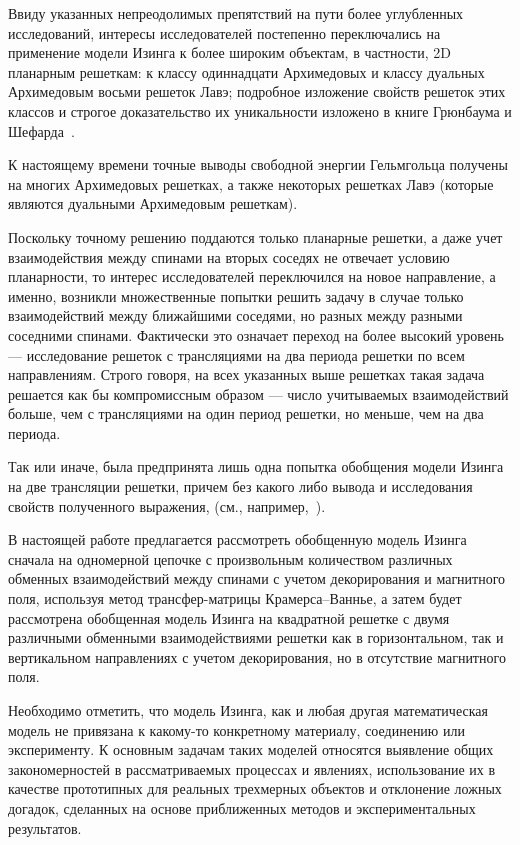 Ввиду указанных непреодолимых препятствий на пути более углубленных исследований, интересы исследователей постепенно переключались на применение модели Изинга к более широким объектам, в частности, 2D планарным решеткам: к классу одиннадцати Архимедовых и классу дуальных Архимедовым восьми решеток Лавэ; подробное изложение свойств решеток этих классов и строгое доказательство их уникальности изложено в книге Грюнбаума и Шефарда~\cite{grunbaum1987}. 

К настоящему времени точные выводы свободной энергии Гельмгольца получены на многих Архимедовых  решетках, а также некоторых решетках Лавэ (которые являются дуальными Архимедовым решеткам).

Поскольку точному решению поддаются только планарные решетки, а даже учет взаимодействия между спинами на вторых соседях не отвечает условию планарности, то интерес исследователей переключился на новое направление, а именно, возникли множественные попытки решить задачу в случае только взаимодействий между ближайшими соседями, но разных между разными соседними спинами. Фактически это означает переход на более высокий уровень — исследование решеток с трансляциями на два периода решетки по всем направлениям. Строго говоря, на всех указанных выше решетках такая задача решается как бы компромиссным образом — число учитываемых взаимодействий больше, чем с трансляциями на один период решетки, но меньше, чем на два периода. 

Так или иначе, была предпринята лишь одна попытка обобщения модели Изинга на две трансляции решетки, причем без какого либо вывода и исследования свойств полученного выражения, (см., например,~\cite{utiyama1951, syozi1972}).

В настоящей работе предлагается рассмотреть обобщенную модель Изинга сначала на одномерной цепочке с произвольным количеством различных обменных взаимодействий между спинами с учетом декорирования и магнитного поля, используя метод трансфер-матрицы Крамерса--Ваннье, а затем будет рассмотрена обобщенная модель Изинга на квадратной решетке с двумя различными обменными взаимодействиями решетки как в горизонтальном, так и вертикальном направлениях с учетом декорирования, но в отсутствие магнитного поля.

Необходимо отметить, что модель Изинга, как и любая другая математическая модель не привязана к какому-то конкретному материалу, соединению или эксперименту. К основным задачам таких моделей относятся выявление общих закономерностей в рассматриваемых процессах и явлениях, использование их в качестве прототипных для реальных трехмерных объектов и отклонение ложных догадок, сделанных на основе приближенных методов и экспериментальных результатов. 


